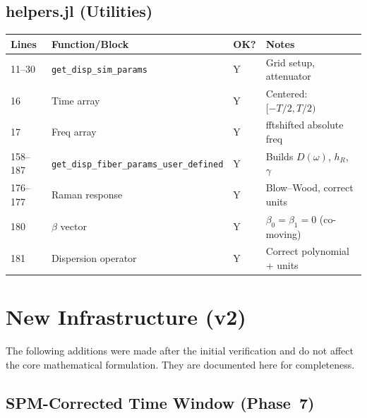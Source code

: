 \documentclass[12pt,a4paper]{article}
\theoremstyle{definition}
\begin{document}
\subsection{helpers.jl (Utilities)}

\begin{center}
\begin{tabular}{p{1.5cm}p{5cm}p{1cm}p{3cm}}
\toprule
\textbf{Lines} & \textbf{Function/Block} & \textbf{OK?} & \textbf{Notes} \\
\midrule
11--30 & \texttt{get\_disp\_sim\_params} & Y & Grid setup, attenuator \\
16 & Time array & Y & Centered: $[-T/2, T/2)$ \\
17 & Freq array & Y & fftshifted absolute freq \\
158--187 & \texttt{get\_disp\_fiber\_params\_user\_defined} & Y & Builds $D(\omega)$, $h_R$, $\gamma$ \\
176--177 & Raman response & Y & Blow--Wood, correct units \\
180 & $\beta$ vector & Y & $\beta_0=\beta_1=0$ (co-moving) \\
181 & Dispersion operator & Y & Correct polynomial + units \\
\bottomrule
\end{tabular}
\end{center}


\section{New Infrastructure (v2)}
\label{sec:new_infra}

The following additions were made after the initial verification and do not affect the core mathematical formulation. They are documented here for completeness.

\subsection{SPM-Corrected Time Window (Phase~7)}
\end{document}
